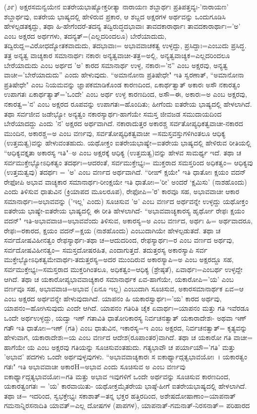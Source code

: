(೨೯) ಅಕ್ಷರಸಮನ್ವಯೇನ ಐತರೇಯಭಾಷ್ಯೋಕ್ತರೀತ್ಯಾ ನಾರಾಯಣ ಶಬ್ದಾರ್ಥಃ ಪ್ರತಿಪತ್ತವ್ಯಃ-'ನಾರಾಯಣ' ಶಬ್ದಾರ್ಥವು, ಐತರೇಯ ಭಾಷ್ಯದಲ್ಲಿ ಹೇಳಿರುವ ಪ್ರಕಾರ, ಆ ಶಬ್ದದ ಅಕ್ಷರಗಳ ಅರ್ಥವನ್ನು ಒಂದುಗೂಡಿಸಿ ಹೇಳಲ್ಪಡತಕ್ಕದ್ದು, ತಥಾ ಹಿ-ಹೇಗೆಂದರೆ-ತದನ್ಯ ತದ್ವಿರುದ್ಧದಭಾವಾಃ ತಾವದಕಾರಾರ್ಥಾಃ ತಾವದಕಾರಾರ್ಥಾಃ='ಅ' ಎಂಬ ಅಕ್ಷರದ ಅರ್ಥಗಳು, ತದನ್ಯತ್=(ಎಲ್ಲದರಿಂದಲೂ) ಬೇರೆಯಾದುದು, ತದ್ವಿರುದ್ದ=ವಿರೋಧದ್ಯೋತಕವಾದುದು, ತದಭಾವಾಃ= ಅಭಾವವಾಚಕತ್ವ ಉಳ್ಳದ್ದು, ಪ್ರಸಿದ್ದಾಃ=ಎಂಬುದು ಪ್ರಸಿದ್ಧ. ತತ್ರ ಅನ್ಯತ್ವ ವಾಚ್ಯಕಾರ ಸಮಾನಾರ್ಥಃ ನಕಾರಃ ಅನ್ಯತ್ವವಾಚೀ-ತತ್ರ=ಅಲ್ಲಿ, ಅನ್ಯತ್ವವಾಚ್ಯಕ=ಎಲ್ಲದರಿಂದಲೂ ಬೇರೆಯಾದುದು ಎಂಬ ಅರ್ಥದ 'ಅ' ಕಾರದ ಸಮಾನಾರ್ಥ ಉಳ್ಳ, ನಕಾರಃ='ನ” ಎಂಬ ಅಕ್ಷರವು, ಅನ್ಯತ್ವ ವಾಚೀ='ಬೇರೆಯಾದುದು'' ಎಂದು ಹೇಳುವುದು. ``ಅಮಾನೋನಾ ಪ್ರತಿಷೇಧೇ" ಇತಿ ಸ್ವರಣಾತ್, ``ಅಮಾನೋನಾ ಪ್ರತಿಷೇಧೇ" ಎಂಬ ನಿಯಮವನ್ನು ಜ್ಞಾಪಕಮಾಡಿಕೊಂಡ ಕಾರಣದಿಂದ, ಏಕಾರ್ಥತ್ವಾತ್ ಅಕಾರಃ ಅಸೌ ನಕಾರತ್ವಂ ಉಪಾಗತಃ ಏಕಾರ್ಥತ್ಯಾತ್='ಒಂದೇ' ಎಂಬ ಅರ್ಥ ಉಳ್ಳ ಕಾರಣದಿಂದ, ಅಸೌ=ಈ, ಅಕಾರಃ=ಅ ಎಂಬ ಅಕ್ಷರವು, ನಕಾರತ್ವ='ನ' ಎಂಬ ಅಕ್ಷರದ ರೂಪವನ್ನು ಉಪಾಗತಃ=ಹೊಂದಿತು; ಹೀಗೆಂದು ಐತರೇಯ ಭಾಷ್ಯದಲ್ಲಿ ಹೇಳಲಾಗಿದೆ. ತಥಾ ಸರ್ವಜೀವ ಜಡೇಭ್ಯೋ ಅನ್ಯತ್ವಂ ನಕಾರಸ್ಯಾರ್ಥಃ-ಹಾಗೆಯೇ ಸಮಸ್ತ ಜೀವಜಡ ಸಮುದಾಯದಿಂದ ಬೇರೆಯಾದದ್ದು ಎಂದು 'ನ' ಅಕ್ಷರದ ಅರ್ಥವಾಗಿದೆ. ನಕಾರಾದುತ್ತರ ಅಕಾರಶ್ಚ ಸರ್ವತೋಪ್ಯಧಿಕತ್ವವಾಚೀ-ನಕಾರದ ಮುಂದಿನ, ಅಕಾರಶ್ಚ=ಅ ಎಂಬ ವರ್ಣವು, ಸರ್ವತೋಪ್ಯಧಿಕತ್ವವಾಚೀ =ಸಮಸ್ತವಸ್ತುಗಳಿಗಿಂತಲೂ ಆಧಿಕ್ಯ (ಉತ್ತಮತ್ವ)ವನ್ನು ಹೇಳುವಂತಹುದು. ಯಥೋಕ್ತಂ ಐತರೇಯಭಾಷ್ಯೇ=ಐತರೇಯ ಭಾಷ್ಯದಲ್ಲಿ ಹೇಳಿರುವ ರೀತಿಯಲ್ಲಿ ``ಆಧಿಕ್ಯವಕ್ತೃತಾ ಅಕಾರಸ್ಯ ಇತಿ"–ಅ ಎಂಬ ಅಕ್ಷರಕ್ಕೆ ಆಧಿಕ್ಯ (ಉತ್ತಮತ್ವ)ವನ್ನು ಹೇಳವ ಸಾಮರ್ಥ್ಯ ಇದೆ. ತಥಾ ಚ ಸರ್ವಮುಕ್ತೇಭ್ಯೋಽಧಿಕತ್ವಂ ತದರ್ಥಃ=ಆದರಂತೆ, ಸರ್ವಮುಕ್ತೇಭ್ಯಃ= ಮುಕ್ತರಾದ ಸಮಸ್ತರಿಂದ ಅಧಿಕತ್ವಂ= ಆಧಿಕ್ಯವು (ಉತ್ತಮತ್ವವು) ತದರ್ಥಃ = 'ಅ' ಎಂಬ ವರ್ಣದ ಅರ್ಥವಾಗಿದೆ. “ರೀಙ್ ಕ್ಷಯೇ" ಇತಿ ಧಾತೋಃ ಕ್ಷಯಂ ವದನ್ ರೇಫೋಪಿ ಅಭಾವ ವಾಚ್ಯಕಾರ ಸಮಾನಾರ್ಥಃ-ರೀಂಕ್ಷಯೇ ಇತಿ ಧಾತೋಃ='ರೀ' ಅಂದರೆ `ಕ್ಷಮಿಸು' (ನಾಶಹೊಂದು) ಎಂದು ತಿಳಿಸುವ ಧಾತುವಿನ (ಕ್ರಿಯಾಪದ ಮೂಲರೂಪ), ರೇಫೋಪಿ='ರ' ಕಾರವೂ ಸಹ, ಅಭಾವವಾಚೀ ಆಕಾರ ಸಮಾನಾರ್ಥಃ=ಅಭಾವವನ್ನು ('ಇಲ್ಲ' ಎಂದು) ಸೂಚಿಸುವ 'ಅ' ಎಂಬ ವರ್ಣದ ಅರ್ಥವನ್ನೇ ಉಳ್ಳದ್ದು ಯಥೋಕ್ತಂ ಐತರೇಯ ಭಾಷ್ಯೇ-ಐತರೇಯ ಭಾಷ್ಯದಲ್ಲಿ ಈ ರೀತಿ ಹೇಳಲಾಗಿದೆ- ``ಅಭಾವವಾಚ್ಯಕಾರಸ್ಯ ಹೃರ್ಥೋ ರೇಫಃ ಕ್ಷಯಂ ವದನ್" ಇತಿ-ಅಭಾವವಾಚಿ=ಅಭಾವವೆಂದು ತಿಳಿಸುವ, ಅಕಾರಸ್ಯ=ಅ ಎಂಬ ವರ್ಣದ, ಅರ್ಥಃ ಹಿ= ಅರ್ಥವಾದರೂ, ರೇಫಃ=ರಕಾರದ, ಕ್ಷಯಂ ವದನ್=ಕ್ಷಯ (ನಾಶಹೊಂದು) ಎಂಬುದಾಗಿಯೇ ಹೇಳಲ್ಪಡುತದೆ. ತಥಾ ಚ ಸರ್ವದೋಷವಿಹೀನತ್ವಂ ರೇಫಸ್ಯಾರ್ಥಃ-ತಥಾ ಚ=ಆದುದರಿಂದ, ರೇಫಸ್ಯಾರ್ಥಃ=ರ ಎಂಬ ವರ್ಣದ ಅರ್ಥವು, ಸರ್ವದೋಷವಿಹೀನತ್ವಂ= ಸಮಸ್ತದೋಷರಹಿತ, ಎಂದಾಗುತ್ತದೆ. ತದುತ್ತರಸ್ಯ ಅಕಾರಸ್ಯಾಪಿ ಸರ್ವ ಮುಕ್ತೇಭ್ಯೋಽಧಿಕತ್ವಮೇವಾರ್ಥಃ-ತದುತ್ತರಸ್ಯ=ಅದರ ಮುಂದಿರುವ ಅಕಾರಸ್ಯಾಪಿ=ಅ ಎಂಬ ಅಕ್ಷರದ್ದೂ ಸಹ, ಸರ್ವಮುಕ್ತೇಭ್ಯಃ=ಸಮಸ್ತರಾದ ಮುಕ್ತರಿಗಿಂತಲೂ, ಅಧಿಕತ್ವಂ=ಆಧಿಕ್ಯ (ಶ್ರೇಷ್ಠತೆ), ಏವಾರ್ಥಃ=ಎಂಬರ್ಥ ಉಳ್ಳದ್ದೇ ಆಗಿದೆ. ತಥಾ ಚ ಯಕಾರೋಪ್ಯಭಾವವಾಚ್ಯಕಾರ ಸಮಾನಾರ್ಥಕ ಏವ-ಹಾಗೆಯೇ, ಯಕಾರೋಪಿ='ಯ' ಎಂಬ ವರ್ಣವೂ ಸಹ, ಅಭಾವವಾಚಿ=ಅಭಾವ (ಏನೂ ಇಲ್ಲ) ಎಂಬುದಾಗಿ ಸೂಚಿಸುವ, ಅಕಾರಸಮಾನಾರ್ಥಕ ಏವ=ಆ ಎಂಬ ಅಕ್ಷರದ ಅರ್ಥವನ್ನೇ ಹೇಳುವುದಾಗಿದೆ. ಯಾಪನಂ ಹಿ ಯಕಾರಸ್ವಾರ್ಥಃ='ಯ' ಕಾರದ ಅರ್ಥವು, ಯಾಪನಂ=ಹೋಗಿಸುವುದು ಎಂದೇ ಆಗಿದೆ. ಯಾಪನಂ ಗತಿರಿತಿ ಚೈಕ ಏವಾರ್ಥಃ=ಯಾಪನಂ ಮತ್ತು ಗತಿ ಇವೆರಡೂ ಒಂದೇ ಅರ್ಥಉಳ್ಳದ್ದು, ಯದ್ವಾ ಇಣ್ ಗತಾವಿತಿ ಧಾತೋರಿಕಾರಸ್ಯ ನಿರ್ವಚನತ್ವಾತ್ ಯಕಾರಾದೇಶಃ- ಅಥವಾ ಇಣ್ ಗತೌ ಇತಿ ಧಾತೋಃ=ಇಣ್ (ಗತಿ) ಎಂಬ ಧಾತುವಿನ, ಇಕಾರಸ್ಯ=ಇ ಎಂಬ ಅಕ್ಷರದ, ನಿರ್ವಚನತ್ವಾತ್= ಕೃತ್ಯವನ್ನು ಹೇಳುವಾಗ, ಯಕಾರಾದೇಶಃ=ಯ ಎಂಬ ವರ್ಣದ ಆದೇಶ(ರೂಪಾಂತರ)ವಾಗಿದೆ. ತಥಾ ಚ ಯಕಾರೋ ಗತಿ ವಾಚೀ= ಹಾಗೆಯೇ ಯ ಎಂಬ ಅಕ್ಷರವು ಗತಿಯನ್ನು ಸೂಚಿಸುವಂತಹುದು. ಗತ್ಯಭಾವೌ ಚ ಪರ್ಯಾಯೌ='ಗತಿ' ಮತ್ತು 'ಅಭಾವ' ಪದಗಳು ಒಂದೇ ಅರ್ಥವುಳ್ಳವುಗಳು. ``ಅಭಾವವಾಚ್ಯಕಾರಃ ಸ ಐಕಾರ್ಥ್ಯಾದ್ಗತ್ವಭಾವಯೋಃ~। ಯಕಾರತ್ವಂ ಗತಃ" ಇತಿ ಅಭಾವವಾಚೀ ಅಕಾರH=ಅಭಾವ ಎಂದು ಸೂಚಿಸುವ ಅ ಎಂಬ ವರ್ಣವು ಐಕಾರ್ಥ್ಯಾದ್ಗತ್ಯಭಾವಯೋಃ=ಗತಿ ಮತ್ತು ಅಭಾವ ಇವುಗಳಿಗೆ ಒಂದೇ ಅರ್ಥವನ್ನು ಸೂಚಿಸುವ ಕಾರಣದಿಂದ, ಯಕಾರತ್ವಂಗತಃ = 'ಯ' ಕಾರವಾಯಿತು- ಯಥೋಕ್ತಮೈತರೇಯ ಭಾಷ್ಠೆ-ಹೀಗೆ ಐತರೇಯಭಾಷ್ಯದಲ್ಲಿ ಹೇಳಲಾಗಿದೆ. ತಥಾ ಚ= ಇದರಿಂದ, ಸ್ವಭಕ್ತೇಭ್ಯಃ ಸಕಾಶಾತ್=ತನ್ನ ಭಕ್ತರ ಹತ್ತಿರದಿಂದ, ಅಶೇಷದೋಷಾಣಾಂ=ಯಾಪನಾತ್ ಗಮನಾನ್ನಿರಸನಾದಿತಿ ಯಾವತ್=ಎಲ್ಲ ದೋಷಗಳ (ಪಾಪಗಳ), ಯಾಪನಾತ್-ಗಮನಾತ್-ನಿರಸನಾತ್= ಪರಿಹಾರದ 